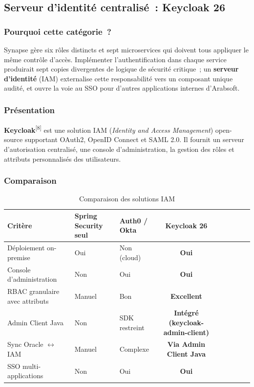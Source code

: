 \subsection{Serveur d'identité centralisé~: Keycloak 26}

\subsubsection*{Pourquoi cette catégorie~?}

Synapse gère six rôles distincts et sept microservices qui doivent tous appliquer le même contrôle d'accès. Implémenter l'authentification dans chaque service produirait sept copies divergentes de logique de sécurité critique~; un \textbf{serveur d'identité} (IAM) externalise cette responsabilité vers un composant unique audité, et ouvre la voie au SSO pour d'autres applications internes d'Arabsoft.

\subsubsection*{Présentation}

\textbf{Keycloak}\textsuperscript{[8]} est une solution IAM (\textit{Identity and Access Management})
open-source supportant OAuth2, OpenID Connect et SAML 2.0. Il fournit un serveur
d'autorisation centralisé, une console d'administration, la gestion des rôles et
attributs personnalisés des utilisateurs.

\subsubsection*{Comparaison}

\begin{table}[H]
\centering
\caption{Comparaison des solutions IAM}
\label{tab:cmp_iam}
\begin{tabularx}{\textwidth}{VlVCVCVCV}
\hline
\textbf{Critère} & \textbf{Spring Security seul} & \textbf{Auth0 / Okta} & \textbf{Keycloak 26} \\
\hline
Déploiement on-premise       & Oui      & Non (cloud) & \textbf{Oui} \\
\hline
Console d'administration     & Non      & Oui         & \textbf{Oui} \\
\hline
RBAC granulaire avec attributs & Manuel & Bon         & \textbf{Excellent} \\
\hline
Admin Client Java            & Non      & SDK restreint  & \textbf{Intégré (keycloak-admin-client)} \\
\hline
Sync Oracle $\leftrightarrow$ IAM & Manuel & Complexe & \textbf{Via Admin Client Java} \\
\hline
SSO multi-applications       & Non      & Oui         & \textbf{Oui} \\
\hline
\end{tabularx}
\end{table}

